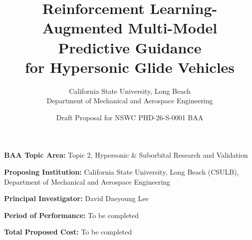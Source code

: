 \documentclass[12pt,letterpaper]{article}
\title{\textbf{Reinforcement Learning-Augmented Multi-Model Predictive Guidance\\for Hypersonic Glide Vehicles}}
\author{
California State University, Long Beach\\
Department of Mechanical and Aerospace Engineering
}
\date{Draft Proposal for NSWC PHD-26-S-0001 BAA}
\begin{document}
\maketitle

\noindent\textbf{BAA Topic Area:} Topic 2, Hypersonic \& Suborbital Research and Validation

\noindent\textbf{Proposing Institution:} California State University, Long Beach (CSULB), Department of Mechanical and Aerospace Engineering

\noindent\textbf{Principal Investigator:} David Daeyoung Lee

\noindent\textbf{Period of Performance:} To be completed

\noindent\textbf{Total Proposed Cost:} To be completed














\end{document}
